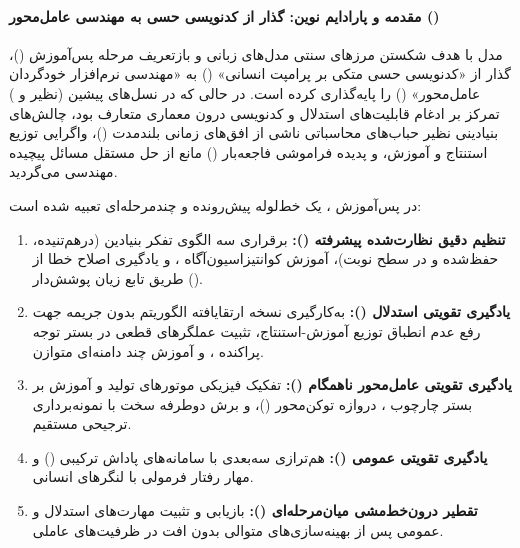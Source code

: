 \item {}

\paragraph*{مقدمه و پارادایم نوین: گذار از کدنویسی حسی به مهندسی عامل‌محور ()}
مدل  \cite{glm2026glm5} با هدف شکستن مرزهای سنتی مدل‌های زبانی و بازتعریف مرحله پس‌آموزش ()، گذار از «کدنویسی حسی متکی بر پرامپت انسانی» () به «مهندسی نرم‌افزار خودگردان عامل‌محور» () را پایه‌گذاری کرده است. در حالی که در نسل‌های پیشین (نظیر  و ) تمرکز بر ادغام قابلیت‌های استدلال و کدنویسی درون معماری متعارف  بود، چالش‌های بنیادینی نظیر حباب‌های محاسباتی ناشی از افق‌های زمانی بلندمدت ()، واگرایی توزیع استنتاج و آموزش، و پدیده فراموشی فاجعه‌بار () مانع از حل مستقل مسائل پیچیده مهندسی می‌گردید.

در پس‌آموزش ، یک خط‌لوله پیش‌رونده و چندمرحله‌ای تعبیه شده است:
\begin{enumerate}
    \item \textbf{تنظیم دقیق نظارت‌شده پیشرفته ():} برقراری سه الگوی تفکر بنیادین (درهم‌تنیده، حفظ‌شده و در سطح نوبت)، آموزش کوانتیزاسیون‌آگاه ، و یادگیری اصلاح خطا از طریق تابع زیان پوشش‌دار ().
    \item \textbf{یادگیری تقویتی استدلال ():} به‌کارگیری نسخه ارتقایافته الگوریتم  بدون جریمه  جهت رفع عدم انطباق توزیع آموزش-استنتاج، تثبیت عملگرهای قطعی  در بستر توجه پراکنده ، و آموزش چند دامنه‌ای متوازن.
    \item \textbf{یادگیری تقویتی عامل‌محور ناهمگام ():} تفکیک فیزیکی موتورهای تولید و آموزش بر بستر چارچوب ، دروازه توکن‌محور ()، و برش دوطرفه سخت با نمونه‌برداری ترجیحی مستقیم.
    \item \textbf{یادگیری تقویتی عمومی ():} هم‌ترازی سه‌بعدی با سامانه‌های پاداش ترکیبی () و مهار رفتار فرمولی با لنگرهای انسانی.
    \item \textbf{تقطیر درون‌خط‌مشی میان‌مرحله‌ای ():} بازیابی و تثبیت مهارت‌های استدلال و عمومی پس از بهینه‌سازی‌های متوالی بدون افت در ظرفیت‌های عاملی.
\end{enumerate}

